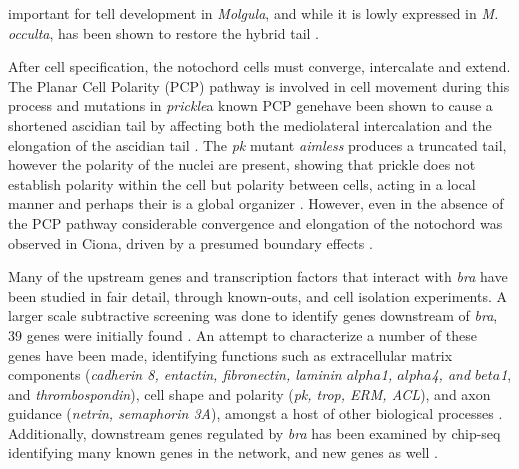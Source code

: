 important for tell development in \textit{Molgula}, and while it is lowly expressed in \textit{M. occulta}, has been shown to restore the hybrid tail \cite{swalla_requirement_1996, swalla_multigene_1999}. 
  
After cell specification, the notochord cells must converge, intercalate and extend. The Planar Cell Polarity (PCP) pathway is involved in cell movement during this process and mutations in \textit{prickle}\textemdash a known PCP gene\textemdash have been shown to cause a shortened ascidian tail by affecting both the mediolateral intercalation and the elongation of the ascidian tail \cite{jiang_ascidian_2005}. The \textit{pk} mutant \textit{aimless} produces a truncated tail, however the polarity of the nuclei are present, showing that prickle does not establish polarity within the cell but polarity between cells, acting in a local manner and perhaps their is a global organizer \cite{jiang_ascidian_2005,kourakis_one-dimensional_2014}. However, even in the absence of the PCP pathway considerable convergence and elongation of the notochord was observed in Ciona, driven by a presumed boundary effects \cite{veeman_chongmague_2008}.

Many of the upstream genes and transcription factors that interact with \textit{bra} have been studied in fair detail, through known-outs, and cell isolation experiments. A larger scale subtractive screening was done to identify genes downstream of \textit{bra}, 39 genes were initially found \cite{hotta_temporal_1999}. An attempt to characterize a number of these genes have been made, identifying functions such as extracellular matrix components (\textit{cadherin 8, entactin, fibronectin, laminin $alpha$1, $alpha$4, and $beta$1}, and {\em thrombospondin}), cell shape and polarity (\textit{pk, trop, ERM, ACL}), and axon guidance (\textit{netrin, semaphorin 3A}), amongst a host of other biological processes \cite{hotta_characterization_2000,hotta_brachyury-downstream_2007,kugler_evolutionary_2008}. Additionally, downstream genes regulated by \textit{bra} has been examined by chip-seq identifying many known genes in the network, and new genes as well \cite{kubo_genomic_2010,katikala_functional_2013}.


